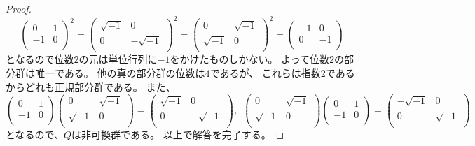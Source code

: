 \documentclass[uplatex]{jsreport}
\theoremstyle{definition}
\begin{document}
\begin{proof}
  \[
  \begin{pmatrix}
    0 & 1 \\
    -1 & 0 \\
  \end{pmatrix}^2
  =
  \begin{pmatrix}
    \sqrt{-1} & 0 \\
    0 & -\sqrt{-1} \\
  \end{pmatrix}^2
  =
  \begin{pmatrix}
    0 & \sqrt{-1} \\
    \sqrt{-1} & 0 \\
  \end{pmatrix}^2
  =
  \begin{pmatrix}
    -1 & 0 \\
    0 & -1 \\
  \end{pmatrix}
  \]
  となるので位数\(2\)の元は単位行列に\(-1\)をかけたものしかない。
  よって位数\(2\)の部分群は唯一である。
  他の真の部分群の位数は\(4\)であるが、
  これらは指数\(2\)であるからどれも正規部分群である。
  また、
  \[
  \begin{pmatrix}
    0 & 1 \\
    -1 & 0 \\
  \end{pmatrix}
  \begin{pmatrix}
    0 & \sqrt{-1} \\
    \sqrt{-1} & 0 \\
  \end{pmatrix}
  =
  \begin{pmatrix}
    \sqrt{-1} & 0 \\
    0 & -\sqrt{-1} \\
  \end{pmatrix}, \ \
  \begin{pmatrix}
    0 & \sqrt{-1} \\
    \sqrt{-1} & 0 \\
  \end{pmatrix}
  \begin{pmatrix}
    0 & 1 \\
    -1 & 0 \\
  \end{pmatrix}
  =
  \begin{pmatrix}
    -\sqrt{-1} & 0 \\
    0 & \sqrt{-1} \\
  \end{pmatrix}
  \]
  となるので、\(Q\)は非可換群である。
  以上で解答を完了する。
\end{proof}
\end{document}

